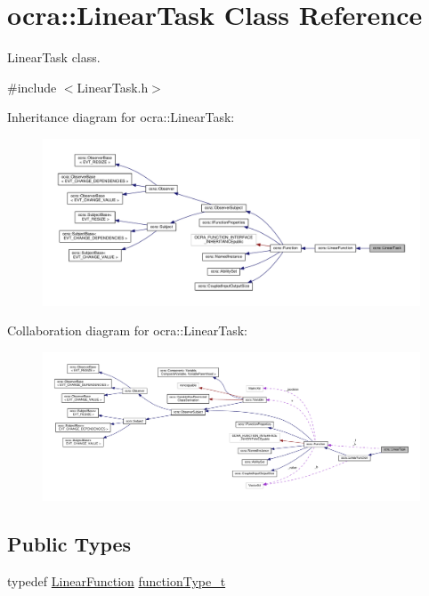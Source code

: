 \hypertarget{classocra_1_1LinearTask}{}\section{ocra\+:\+:Linear\+Task Class Reference}
\label{classocra_1_1LinearTask}


Linear\+Task class.  




{\ttfamily \#include $<$Linear\+Task.\+h$>$}



Inheritance diagram for ocra\+:\+:Linear\+Task\+:
\nopagebreak
\begin{figure}[H]
\begin{center}
\leavevmode
\includegraphics[width=350pt]{d6/d21/classocra_1_1LinearTask__inherit__graph}
\end{center}
\end{figure}


Collaboration diagram for ocra\+:\+:Linear\+Task\+:
\nopagebreak
\begin{figure}[H]
\begin{center}
\leavevmode
\includegraphics[width=350pt]{db/d92/classocra_1_1LinearTask__coll__graph}
\end{center}
\end{figure}
\subsection*{Public Types}
\begin{DoxyCompactItemize}
\item 
typedef \hyperlink{classocra_1_1LinearFunction}{Linear\+Function} \hyperlink{classocra_1_1LinearTask_a72e12356b5513585a17c44d00d819289}{function\+Type\+\_\+t}
\end{DoxyCompactItemize}
